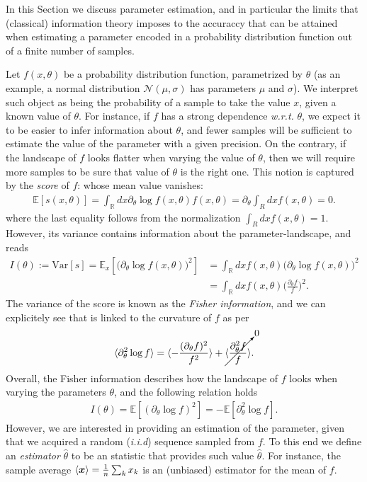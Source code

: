 In this Section we discuss parameter estimation, and in particular the limits that (classical) information theory imposes to the accuraccy that can be attained when estimating a parameter encoded in a probability distribution function out of a finite number of samples.

Let $f(x, \theta)$ be a probability distribution function, parametrized by $\theta$ (as an example, a normal distribution $\mathcal{N}(\mu,\sigma)$ has parameters $\mu$ and $\sigma$). We interpret such object as being the probability of a sample to take the value $x$, given a known value of $\theta$. For instance, if $f$ has a strong dependence \textit{w.r.t.} $\theta$, we expect it to be easier to infer information about $\theta$, and fewer samples will be sufficient to estimate the value of the parameter with a given precision. On the contrary, if the landscape of $f$ looks flatter when varying the value of $\theta$, then we will require more samples to be sure that value of $\theta$ is the right one. This notion is captured by the \textit{score} of $f$:
whose mean value vanishes:
\begin{align*}
\mathbb{E}[s(x,\theta)] = \int_\mathbb{R} dx \partial_\theta \log f(x,\theta) f(x,\theta) = \partial_\theta \int_R dx f(x,\theta) = 0.
\end{align*}
where the last equality follows from the normalization $\int_R dx f(x,\theta)=1$. However, its variance contains information about the parameter-landscape, and reads
\begin{align*}
I(\theta):= \text{Var}[s] = \mathbb{E}_x[\big(\partial_\theta \log f(x,\theta)\big)^2] &= \int_\mathbb{R} dx f(x,\theta) \big(\partial_\theta \log f(x,\theta)\big)^2 \\&= \int_\mathbb{R} dx f(x,\theta) \Big(\frac{\partial_\theta f}{f}\Big)^2.
\end{align*}
The variance of the score is known as the \textit{Fisher information}, and we can explicitely see that is linked to the curvature of $f$ as per
\begin{align*}
\langle\partial^2_\theta \log f \rangle = \langle - \frac{(\partial_\theta f)^2}{f^2}\rangle + \cancelto{0}{\langle \frac{\partial^2_\theta f}{f} \rangle}.
\end{align*}
Overall, the Fisher information describes how the landscape of $f$ looks when varying the parameters $\theta$, and the following relation holds
\begin{align}I(\theta) = \mathbb{E}[(\partial_\theta \log f)^2] = - \mathbb{E}[\partial^2_\theta \log f].\end{align}
However, we are interested in providing an estimation of the parameter, given that we acquired a random (\textit{i.i.d}) sequence sampled from $f$. To this end we define an \textit{estimator} $\hat{\theta}$ to be an statistic that provides such value $\hat{\theta}$. For instance, the sample average $\mathinner{\langle \bm{x}\rangle} = \frac{1}{n}\sum_k x_k$ is an (unbiased) estimator for the mean of $f$.


